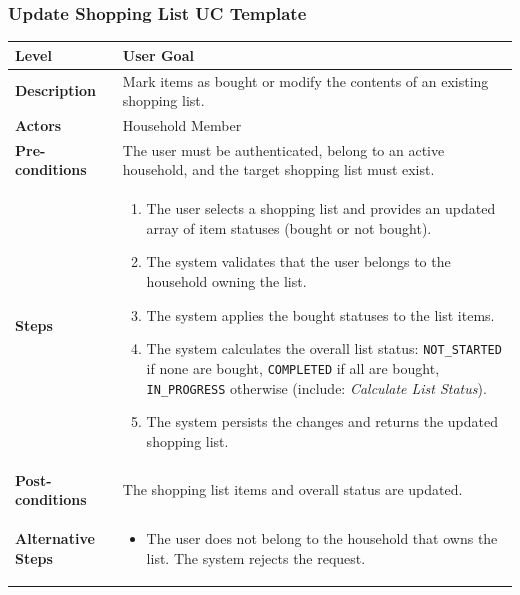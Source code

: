 \subsubsection{Update Shopping List UC Template}
\begin{longtable}{|p{3.5cm}|p{10.3cm}|}
\hline
\rowcolor{UCRow} \textbf{Level} & User Goal \\ \hline
\textbf{Description} & Mark items as bought or modify the contents of an existing shopping list. \\ \hline
\rowcolor{UCRow} \textbf{Actors} & Household Member \\ \hline
\textbf{Pre-conditions} & The user must be authenticated, belong to an active household, and the target shopping list must exist. \\ \hline
\rowcolor{UCRow} \textbf{Steps} &
\begin{enumerate}[nosep, leftmargin=*]
    \item The user selects a shopping list and provides an updated array of item statuses (bought or not bought).
    \item The system validates that the user belongs to the household owning the list.
    \item The system applies the bought statuses to the list items.
    \item The system calculates the overall list status: \texttt{NOT\_STARTED} if none are bought, \texttt{COMPLETED} if all are bought, \texttt{IN\_PROGRESS} otherwise (include: \textit{Calculate List Status}).
    \item The system persists the changes and returns the updated shopping list.
\end{enumerate} \\ \hline
\textbf{Post-conditions} & The shopping list items and overall status are updated. \\ \hline
\rowcolor{UCRow} \textbf{Alternative Steps} &
\begin{itemize}[nosep, leftmargin=2.5em]
    \item[\textbf{A1.}] The user does not belong to the household that owns the list. The system rejects the request.
\end{itemize} \\ \hline
\end{longtable}


